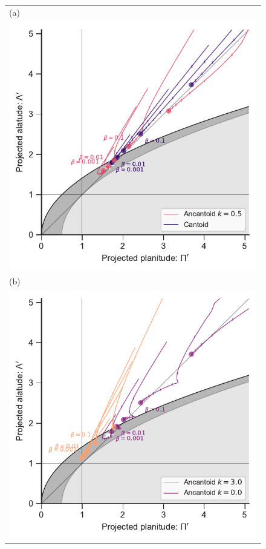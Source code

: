 \begin{figure}
  \centering
  \begin{tabular}{@{}l@{}}
    (a) \\
    \includegraphics{figs/ancantoid-R90-vs-Rc-a} \\
    (b) \\
    \includegraphics{figs/ancantoid-R90-vs-Rc-b}

\end{tabular}
\end{figure}

